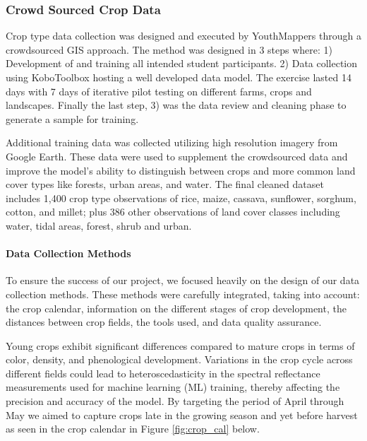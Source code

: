 \documentclass[
]{article}
\begin{document}
\hypertarget{crowd-sourced-crop-data}{%
\subsubsection{Crowd Sourced Crop Data}\label{crowd-sourced-crop-data}}

Crop type data collection was designed and executed by YouthMappers
through a crowdsourced GIS approach. The method was designed in 3 steps
where: 1) Development of and training all intended student participants.
2) Data collection using KoboToolbox hosting a well developed data
model. The exercise lasted 14 days with 7 days of iterative pilot
testing on different farms, crops and landscapes. Finally the last step,
3) was the data review and cleaning phase to generate a sample for
training.

Additional training data was collected utilizing high resolution imagery
from Google Earth. These data were used to supplement the crowdsourced
data and improve the model's ability to distinguish between crops and
more common land cover types like forests, urban areas, and water. The
final cleaned dataset includes 1,400 crop type observations of rice,
maize, cassava, sunflower, sorghum, cotton, and millet; plus 386 other
observations of land cover classes including water, tidal areas, forest,
shrub and urban.

\hypertarget{data-collection-methods}{%
\paragraph{Data Collection Methods}\label{data-collection-methods}}

To ensure the success of our project, we focused heavily on the design
of our data collection methods. These methods were carefully integrated,
taking into account: the crop calendar, information on the different
stages of crop development, the distances between crop fields, the tools
used, and data quality assurance.

Young crops exhibit significant differences compared to mature crops in
terms of color, density, and phenological development. Variations in the
crop cycle across different fields could lead to heteroscedasticity in
the spectral reflectance measurements used for machine learning (ML)
training, thereby affecting the precision and accuracy of the model. By
targeting the period of April through May we aimed to capture crops late
in the growing season and yet before harvest as seen in the crop
calendar in Figure \ref{fig:crop_cal} below.
\end{document}
